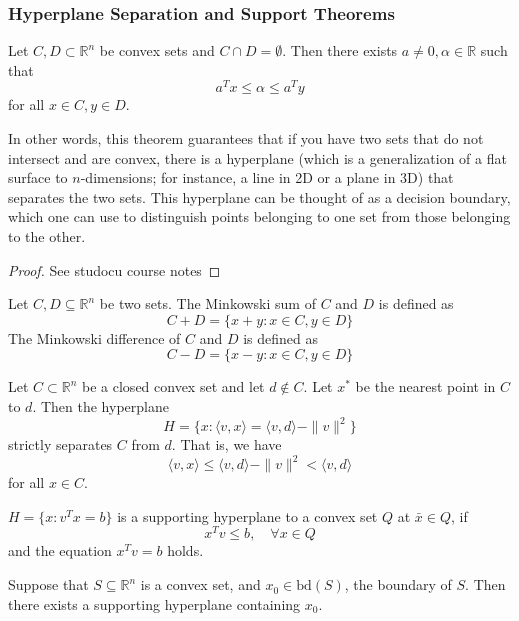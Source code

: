 \subsubsection{Hyperplane Separation and Support Theorems}
\begin{theorem}
    Let $C, D \subset \mathbb R^n$ be convex sets and $C \cap D = \emptyset$. Then there exists $a \neq 0, \alpha \in \mathbb R$ such that $$a^Tx \leq \alpha \leq a^Ty$$ for all $x \in C, y \in D$.

    \bigskip
    In other words, this theorem guarantees that if you have two sets that do not intersect and are convex, there is a hyperplane (which is a generalization of a flat surface to $n$-dimensions; for instance, a line in 2D or a plane in 3D) that separates the two sets. This hyperplane can be thought of as a decision boundary, which one can use to distinguish points belonging to one set from those belonging to the other.
\end{theorem}
\begin{proof}[Proof]
    See studocu course notes
\end{proof}
\begin{definition}
    Let $C, D \subseteq \mathbb R^n$ be two sets. The Minkowski sum of $C$ and $D$ is defined as
    $$C + D = \{x + y: x \in C, y \in D\}$$
    The Minkowski difference of $C$ and $D$ is defined as
    $$C - D = \{x - y: x \in C, y \in D\}$$
\end{definition}
\begin{lemma}
    Let $C \subset \mathbb R^n$ be a closed convex set and let $d \not \in C$. Let $x^*$ be the nearest point in $C$ to $d$. Then the hyperplane $$H = \{x: \langle v, x \rangle = \langle v, d \rangle - \|v\|^2\}$$ strictly separates $C$ from $d$. That is, we have
    $$\langle v, x \rangle \leq \langle v, d \rangle - \|v\|^2 < \langle v, d \rangle$$ for all $x \in C$.
\end{lemma}
\begin{definition}
    $H = \{x: v^Tx = b\}$ is a supporting hyperplane to a convex set $Q$ at $\bar x \in Q$, if 
    $$x^Tv \leq b , \quad \forall x \in Q$$ and the equation $x^T v = b$ holds.
\end{definition}
\begin{theorem}
    Suppose that $S \subseteq \mathbb R^n$ is a convex set, and $x_0 \in \text{bd}(S)$, the boundary of $S$. Then there exists a supporting hyperplane containing $x_0$.
\end{theorem}
